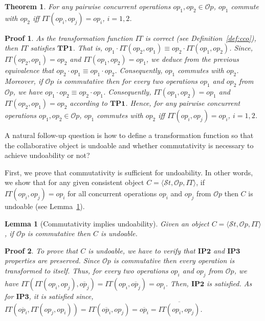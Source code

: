 \documentclass[submission,copyright,creativecommons]{eptcs}
\newtheorem{lemma}{Lemma}
\newtheorem*{proof*}{Proof}\newtheorem{theorem}{Theorem}
\begin{document}
\begin{theorem}\label{thr:concCommutativity}  
 For any pairwise concurrent operations $op_1, op_2\in \mathcal{O}p$, $op_1$ commute with $op_2$   iff   $IT(op_i,op_j)=op_i$, $i=1,2$.
\end{theorem}

\begin{proof*}
As the transformation function $IT$ is correct (see Definition~\ref{def:cco}), then $IT$ satisfies $\mathbf{TP1}$. That is, $  op_1\cdot IT(op_2,op_1) \equiv   op_2\cdot IT(op_1,op_2)$. Since, 
$  IT(op_2,op_1) =op_2$ and $ IT(op_1,op_2)= op_1$, we deduce from the previous equivalence that $op_2 \cdot op_1 \equiv op_1 \cdot op_2$. Consequently, $op_1$ commutes with $op_2$.
Moreover, if $\mathcal{O}p$ is commutative then for every two operations $op_1$ and $op_2$ from $\mathcal{O}p$, we have $op_1 \cdot op_2 \equiv op_2 \cdot op_1$. Consequently,   $IT(op_1,op_2)=op_1$ and $IT(op_2,op_1)=op_2$ according to $\mathbf{TP1}$.
Hence, for any pairwise concurrent operations $op_1, op_2\in \mathcal{O}p$, $op_1$ commutes with $op_2$   iff   $IT(op_i,op_j)=op_i$, $i=1,2$.
\end{proof*}

A natural follow-up question is how to define  a transformation function so that the collaborative
object is undoable and whether commutativity is necessary to achieve undoability or not? 


First, we prove  that commutativity is sufficient for undoability. In other words,
we  show   that for any given consistent object $C=\langle\mathcal{S}t,\mathcal{O}p,IT\rangle$,   if   $ IT(op_i,op_j)=op_i$ for all concurrent operations $op_i$ and $op_j$ from $\mathcal{O}p$    then $C$ is undoable (see  Lemma~\ref{lemm:commRev}).
 


\begin{lemma}[Commutativity implies undoability]\label{lemm:commRev}
Given an object $C=\langle\mathcal{S}t,\mathcal{O}p,IT\rangle$, 
if $\mathcal{O}p$ is commutative then $C$ is undoable. 
\end{lemma}

\begin{proof*}To prove that $C$ is undoable, we  have to verify that $\mathbf{IP2}$ and $\mathbf{IP3}$ properties are preserved.
Since $\mathcal{O}p$ is commutative then every operation is transformed to itself. Thus, for every two operations $op_i$ and $op_j$ from $\mathcal{O}p$,  we have
$
IT(IT(op_i,op_j),\overline{op_j})=IT(op_i,\overline{op_j})=op_i
$. 
 Then, $\mathbf{IP2}$  is satisfied.
As for $\mathbf{IP3}$, it is satisfied since,
$
IT(\overline{op_i}, IT(op_j,op_i)) =  IT(\overline{op_i}, op_j) = \overline{op_i}= \overline{IT(op_i,op_j)}
$.
\end{proof*}
\end{document}
